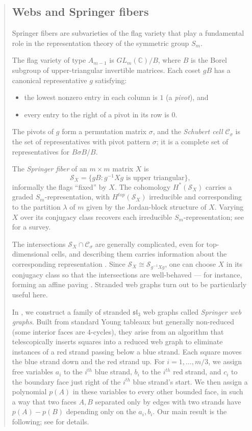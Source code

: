 \documentclass[letterpaper,11pt]{amsart}
\begin{document}
\begin{abstract}
\subsection{Webs and Springer fibers}\label{subsec:springer}
 
Springer fibers are subvarieties of the flag variety that play a fundamental role in the representation theory of the symmetric group $S_m$.
 
The flag variety of type $A_{m-1}$ is $GL_m(\mathbb{C})/B$, where $B$ is the Borel subgroup of upper-triangular invertible matrices. Each coset $gB$ has a canonical representative $g$ satisfying:
\begin{itemize}
\item the lowest nonzero entry in each column is $1$ (a \emph{pivot}), and
\item every entry to the right of a pivot in its row is $0$.
\end{itemize}
The pivots of $g$ form a permutation matrix $\sigma$, and the \emph{Schubert cell} $\mathcal{C}_\sigma$ is the set of representatives with pivot pattern $\sigma$; it is a complete set of representatives for $B\sigma B/B$.
 
The \emph{Springer fiber} of an $m\times m$ matrix $X$ is
\[\mathcal{S}_X=\{gB: g^{-1}Xg \text{ is upper triangular}\},\]
informally the flags ``fixed'' by $X$. The cohomology $H^*(\mathcal{S}_X)$ carries a graded $S_m$-representation, with $H^{top}(\mathcal{S}_X)$ irreducible and corresponding to the partition $\lambda$ of $m$ given by the Jordan-block structure of $X$. Varying $X$ over its conjugacy class recovers each irreducible $S_m$-representation; see \cite{Tym17} for a survey.
 
The intersections $\mathcal{S}_X\cap\mathcal{C}_\sigma$ are generally complicated, even for top-dimensional cells, and describing them carries information about the corresponding representation \cite{Fung, Shi80, Spa76, Tym17}. Since $\mathcal{S}_X\cong\mathcal{S}_{g^{-1}Xg}$, one can choose $X$ in its conjugacy class so that the intersections are well-behaved --- for instance, forming an affine paving \cite{Pre13, Tym06}. Stranded web graphs turn out to be particularly useful here.
 
In \cite{HLTT}, we construct a family of stranded $\mathfrak{sl}_3$ web graphs called \emph{Springer web graphs}. Built from standard Young tableaux but generally non-reduced (some interior faces are $4$-cycles), they arise from an algorithm that telescopically inserts squares into a reduced web graph to eliminate instances of a red strand passing below a blue strand. Each square moves the blue strand down and the red strand up. For $i=1,\ldots,m/3$, we assign free variables $a_i$ to the $i^{th}$ blue strand, $b_i$ to the $i^{th}$ red strand, and $c_i$ to the boundary face just right of the $i^{th}$ blue strand's start. We then assign a polynomial $p(A)$ in these variables to every other bounded face, in such a way that two faces $A, B$ separated only by edges with two strands have $p(A)-p(B)$ depending only on the $a_i, b_i$. Our main result is the following; see \cite{HLTT} for details.
 

\end{abstract}
\end{document}
